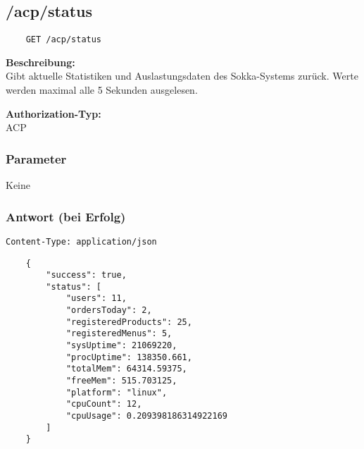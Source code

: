 \subsection{/acp/status}

\begin{lstlisting}
    GET /acp/status
\end{lstlisting}

\textbf{Beschreibung:} \\
Gibt aktuelle Statistiken und Auslastungsdaten des Sokka-Systems zurück. Werte werden maximal alle 5 Sekunden ausgelesen.

\textbf{Authorization-Typ:} \\
ACP

\subsubsection{Parameter}
Keine

\subsubsection{Antwort (bei Erfolg)}

\lstinline{Content-Type: application/json}
\begin{lstlisting}
    {
        "success": true, 
        "status": [
            "users": 11,
            "ordersToday": 2,
            "registeredProducts": 25,
            "registeredMenus": 5,
            "sysUptime": 21069220,
            "procUptime": 138350.661,
            "totalMem": 64314.59375,
            "freeMem": 515.703125,
            "platform": "linux",
            "cpuCount": 12,
            "cpuUsage": 0.209398186314922169
        ]
    }
\end{lstlisting}


